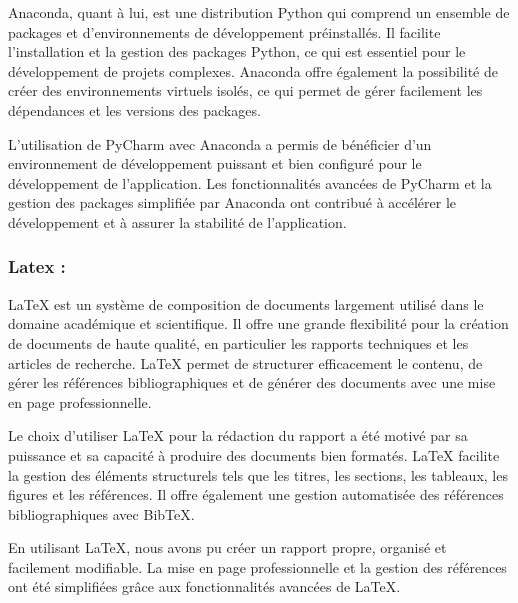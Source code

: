 \documentclass[12pt,a4paper]{report}
\begin{document}
Anaconda, quant à lui, est une distribution Python qui comprend un ensemble de packages et d'environnements de développement préinstallés. Il facilite l'installation et la gestion des packages Python, ce qui est essentiel pour le développement de projets complexes. Anaconda offre également la possibilité de créer des environnements virtuels isolés, ce qui permet de gérer facilement les dépendances et les versions des packages.

L'utilisation de PyCharm avec Anaconda a permis de bénéficier d'un environnement de développement puissant et bien configuré pour le développement de l'application. Les fonctionnalités avancées de PyCharm et la gestion des packages simplifiée par Anaconda ont contribué à accélérer le développement et à assurer la stabilité de l'application.

\subsubsection{Latex :} 
LaTeX est un système de composition de documents largement utilisé dans le domaine académique et scientifique. Il offre une grande flexibilité pour la création de documents de haute qualité, en particulier les rapports techniques et les articles de recherche. LaTeX permet de structurer efficacement le contenu, de gérer les références bibliographiques et de générer des documents avec une mise en page professionnelle.

Le choix d'utiliser LaTeX pour la rédaction du rapport a été motivé par sa puissance et sa capacité à produire des documents bien formatés. LaTeX facilite la gestion des éléments structurels tels que les titres, les sections, les tableaux, les figures et les références. Il offre également une gestion automatisée des références bibliographiques avec BibTeX.

En utilisant LaTeX, nous avons pu créer un rapport propre, organisé et facilement modifiable. La mise en page professionnelle et la gestion des références ont été simplifiées grâce aux fonctionnalités avancées de LaTeX.
\end{document}
